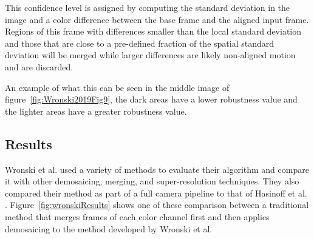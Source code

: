 \documentclass{sig-alternate}
\begin{document}
This confidence level is assigned by computing the standard deviation in the image and a color difference between the base frame and the aligned input frame. Regions of this frame with differences smaller than the local standard deviation and those that are close to a pre-defined fraction of the spatial standard deviation will be merged while larger differences are likely non-aligned motion and are discarded.

An example of what this can be seen in the middle image of figure~\ref{fig:Wronski2019Fig9}, the dark areas have a lower robustness value and the lighter areas have a greater robustness value.






\subsection{Results}



Wronski et al. used a variety of methods to evaluate their algorithm and compare it with other demosaicing, merging, and super-resolution techniques. They also compared their method as part of a full camera pipeline to that of Hasinoff et al. \cite{Hasinoff2016}. Figure~\ref{fig:wronskiResults} shows one of these comparison between a traditional method that merges frames of each color channel first and then applies demosaicing to the method developed by Wronski et al. \cite{Wronski2019}
\end{document}
